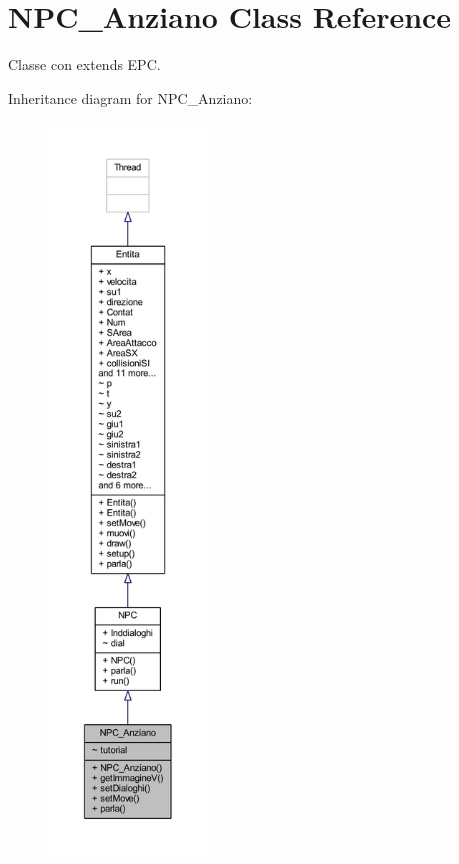 \hypertarget{class_entita_1_1_n_p_c___anziano}{}\section{N\+P\+C\+\_\+\+Anziano Class Reference}
\label{class_entita_1_1_n_p_c___anziano}


Classe con extends E\+PC.  




Inheritance diagram for N\+P\+C\+\_\+\+Anziano\+:
\nopagebreak
\begin{figure}[H]
\begin{center}
\leavevmode
\includegraphics[height=550pt]{class_entita_1_1_n_p_c___anziano__inherit__graph}
\end{center}
\end{figure}


